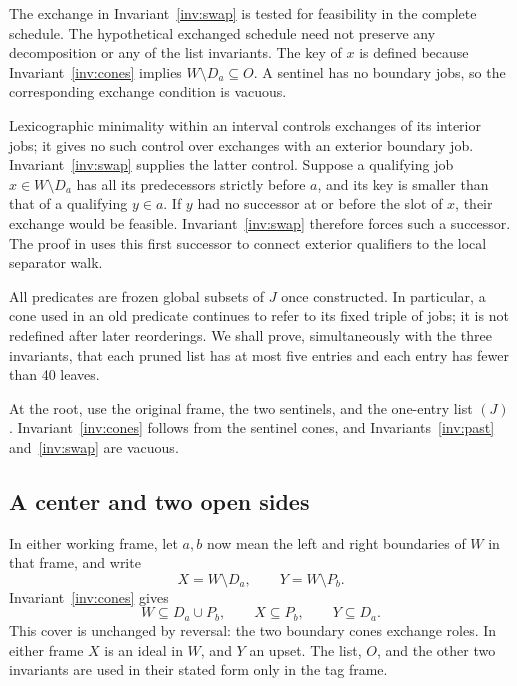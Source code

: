 The exchange in Invariant~\ref{inv:swap} is tested for feasibility in
the complete schedule. The hypothetical exchanged schedule need not
preserve any decomposition or any of the list invariants.
The key of \(x\) is defined because Invariant~\ref{inv:cones} implies
\(W\setminus D_a\subseteq O\). A sentinel has no boundary jobs, so
the corresponding exchange condition is vacuous.

Lexicographic minimality within an interval controls exchanges of its
interior jobs; it gives no such control over exchanges with an exterior
boundary job. Invariant~\ref{inv:swap} supplies the latter control.
Suppose a qualifying job \(x\in W\setminus D_a\) has all its
predecessors strictly before \(a\), and its key is smaller than
that of a qualifying \(y\in a\). If \(y\) had no successor at or
before the slot of \(x\), their exchange would be feasible.
Invariant~\ref{inv:swap} therefore forces such a successor.
The proof in  uses this first successor to
connect exterior qualifiers to the local separator walk.

All predicates are frozen global subsets of \(J\) once constructed.
In particular, a cone used in an old predicate continues to refer to
its fixed triple of jobs; it is not redefined after later reorderings.
We shall prove, simultaneously with the three invariants, that each
pruned list has at most five entries and each entry has fewer than
40 leaves.

At the root, use the original frame, the two sentinels, and the one-entry
list \((J)\). Invariant~\ref{inv:cones} follows from the sentinel cones,
and Invariants~\ref{inv:past} and~\ref{inv:swap} are vacuous.

\subsection{A center and two open sides}

In either working frame, let \(a,b\) now mean the left and right
boundaries of \(W\) in that frame, and write
\[
 X=W\setminus D_a,\qquad Y=W\setminus P_b.
\]
Invariant~\ref{inv:cones} gives
\begin{equation}
 W\subseteq D_a\cup P_b,\qquad X\subseteq P_b,\qquad Y\subseteq D_a.
 \label{eq:cover}
\end{equation}
This cover is unchanged by reversal: the two boundary cones exchange
roles. In either frame \(X\) is an ideal in \(W\), and \(Y\) an
upset. The list, \(O\), and the other two invariants are used in their
stated form only in the tag frame.


